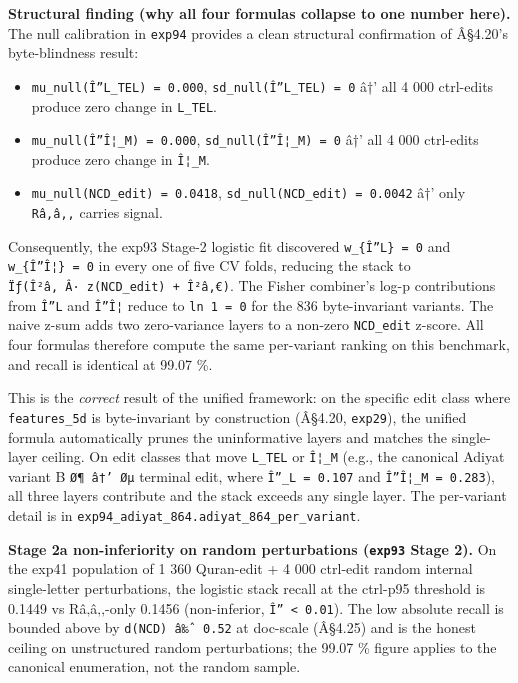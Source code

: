 \documentclass[
]{article}
\providecommand{\tightlist}{%
  \setlength{\itemsep}{0pt}\setlength{\parskip}{0pt}}
\begin{document}
\textbf{Structural finding (why all four formulas collapse to one number
here).} The null calibration in \texttt{exp94} provides a clean
structural confirmation of Â§4.20's byte-blindness result:

\begin{itemize}
\tightlist
\item
  \texttt{mu\_null(\textbar{}Î”L\_TEL\textbar{})\ =\ 0.000},
  \texttt{sd\_null(\textbar{}Î”L\_TEL\textbar{})\ =\ 0} â†' all 4 000
  ctrl-edits produce zero change in \texttt{L\_TEL}.
\item
  \texttt{mu\_null(\textbar{}Î”Î¦\_M\textbar{})\ =\ 0.000},
  \texttt{sd\_null(\textbar{}Î”Î¦\_M\textbar{})\ =\ 0} â†' all 4 000
  ctrl-edits produce zero change in \texttt{Î¦\_M}.
\item
  \texttt{mu\_null(NCD\_edit)\ =\ 0.0418},
  \texttt{sd\_null(NCD\_edit)\ =\ 0.0042} â†' only \texttt{Râ‚â‚‚}
  carries signal.
\end{itemize}

Consequently, the exp93 Stage-2 logistic fit discovered
\texttt{w\_\{\textbar{}Î”L\textbar{}\}\ =\ 0} and
\texttt{w\_\{\textbar{}Î”Î¦\textbar{}\}\ =\ 0} in every one of five CV
folds, reducing the stack to
\texttt{Ïƒ(Î²â‚\ Â·\ z(NCD\_edit)\ +\ Î²â‚€)}. The Fisher combiner's
log-p contributions from \texttt{\textbar{}Î”L\textbar{}} and
\texttt{\textbar{}Î”Î¦\textbar{}} reduce to \texttt{ln\ 1\ =\ 0} for the
836 byte-invariant variants. The naive z-sum adds two zero-variance
layers to a non-zero \texttt{NCD\_edit} z-score. All four formulas
therefore compute the same per-variant ranking on this benchmark, and
recall is identical at 99.07 \%.

This is the \emph{correct} result of the unified framework: on the
specific edit class where \texttt{features\_5d} is byte-invariant by
construction (Â§4.20, \texttt{exp29}), the unified formula automatically
prunes the uninformative layers and matches the single-layer ceiling. On
edit classes that move \texttt{L\_TEL} or \texttt{Î¦\_M} (e.g., the
canonical Adiyat variant B \texttt{Ø¶\ â†’\ Øµ} terminal edit, where
\texttt{Î”\_L\ =\ 0.107} and
\texttt{\textbar{}Î”Î¦\_M\textbar{}\ =\ 0.283}), all three layers
contribute and the stack exceeds any single layer. The per-variant
detail is in \texttt{exp94\_adiyat\_864.adiyat\_864\_per\_variant}.

\textbf{Stage 2a non-inferiority on random perturbations (\texttt{exp93}
Stage 2).} On the exp41 population of 1 360 Quran-edit + 4 000 ctrl-edit
random internal single-letter perturbations, the logistic stack recall
at the ctrl-p95 threshold is 0.1449 vs Râ‚â‚‚-only 0.1456 (non-inferior,
\texttt{\textbar{}Î”\textbar{}\ \textless{}\ 0.01}). The low absolute
recall is bounded above by \texttt{d(NCD)\ â‰ˆ\ 0.52} at doc-scale
(Â§4.25) and is the honest ceiling on unstructured random perturbations;
the 99.07 \% figure applies to the canonical enumeration, not the random
sample.
\end{document}
